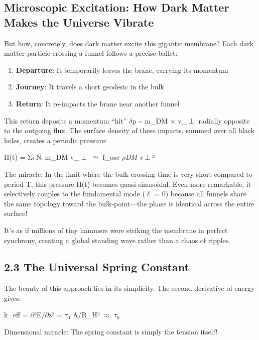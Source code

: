 \documentclass[
  11pt,
]{report}
\providecommand{\tightlist}{%
  \setlength{\itemsep}{0pt}\setlength{\parskip}{0pt}}
\begin{document}
\subsection{Microscopic Excitation: How Dark Matter Makes the Universe
Vibrate}\label{microscopic-excitation-how-dark-matter-makes-the-universe-vibrate}

But how, concretely, does dark matter excite this gigantic membrane?
Each dark matter particle crossing a funnel follows a precise ballet:

\begin{enumerate}
\def\labelenumi{\arabic{enumi}.}
\tightlist
\item
  \textbf{Departure}: It temporarily leaves the brane, carrying its
  momentum
\item
  \textbf{Journey}: It travels a short geodesic in the bulk
\item
  \textbf{Return}: It re-impacts the brane near another funnel
\end{enumerate}

This return deposits a momentum ``hit'' \(\delta\)p \textasciitilde{}
m\_DM × v\_\(\perp\) radially opposite to the outgoing flux. The surface
density of these impacts, summed over all black holes, creates a
periodic pressure:

Π(t) = Σᵢ Ṅᵢ m\_DM v\_\(\perp\) \(\simeq\) f\_osc \(\rho\)\emph{DM
v}\(\perp\)²

The miracle: In the limit where the bulk crossing time is very short
compared to period T, this pressure Π(t) becomes quasi-sinusoidal. Even
more remarkable, it selectively couples to the fundamental mode
(\(\ell\) = 0) because all funnels share the same topology toward the
bulk-point---the phase is identical across the entire surface!

It's as if millions of tiny hammers were striking the membrane in
perfect synchrony, creating a global standing wave rather than a chaos
of ripples.

\subsection{2.3 The Universal Spring
Constant}\label{the-universal-spring-constant}

The beauty of this approach lies in its simplicity. The second
derivative of energy gives:

k\_eff = \(\partial\)²E/\(\partial\)z² = \(\tau_0\) A/R\_H² \(\approx\)
\(\tau_0\)

Dimensional miracle: The spring constant is simply the tension itself!
\end{document}
